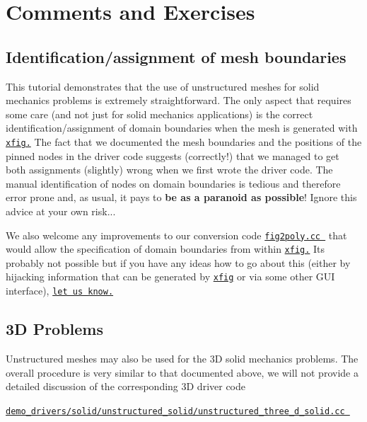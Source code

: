 \hypertarget{index_comm_ex}{}\section{Comments and Exercises}\label{index_comm_ex}
\hypertarget{index_bound}{}\subsection{Identification/assignment of mesh boundaries}\label{index_bound}
This tutorial demonstrates that the use of unstructured meshes for solid mechanics problems is extremely straightforward. The only aspect that requires some care (and not just for solid mechanics applications) is the correct identification/assignment of domain boundaries when the mesh is generated with \href{http://en.wikipedia.org/wiki/Xfig}{\tt xfig.} The fact that we documented the mesh boundaries and the positions of the pinned nodes in the driver code suggests (correctly!) that we managed to get both assignments (slightly) wrong when we first wrote the driver code. The manual identification of nodes on domain boundaries is tedious and therefore error prone and, as usual, it pays to {\bfseries be as a paranoid as possible}! Ignore this advice at your own risk...

We also welcome any improvements to our conversion code \href{../../../../demo_drivers/meshing/mesh_from_xfig_triangle/fig2poly.cc}{\tt fig2poly.\+cc } that would allow the specification of domain boundaries from within \href{http://en.wikipedia.org/wiki/Xfig}{\tt xfig.} It\textquotesingle{}s probably not possible but if you have any ideas how to go about this (either by hijacking information that can be generated by \href{http://en.wikipedia.org/wiki/Xfig}{\tt xfig} or via some other G\+UI interface), \href{../../../contact/html/index.html}{\tt let us know.}



\hypertarget{index_three_d}{}\subsection{3\+D Problems}\label{index_three_d}
Unstructured meshes may also be used for the 3D solid mechanics problems. The overall procedure is very similar to that documented above, we will not provide a detailed discussion of the corresponding 3D driver code

\begin{center} \href{../../../../demo_drivers/solid/unstructured_solid/unstructured_three_d_solid.cc}{\tt demo\+\_\+drivers/solid/unstructured\+\_\+solid/unstructured\+\_\+three\+\_\+d\+\_\+solid.\+cc } \end{center} 


